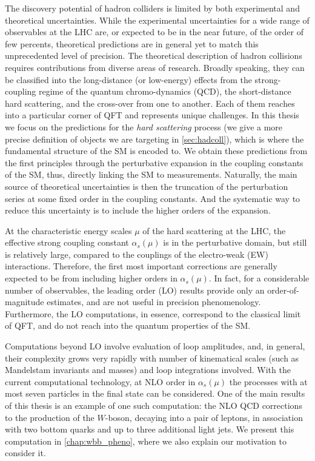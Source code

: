 The discovery potential of hadron colliders is limited by both experimental and theoretical uncertainties.
While the experimental uncertainties for a wide range of observables at the LHC are, or expected to be in the near future, of the order of few percents,
theoretical predictions are in general yet to match this unprecedented level of precision.
The theoretical description of hadron collisions requires contributions from diverse areas of research.
Broadly speaking, they can be classified into the long-distance (or low-energy) effects from 
the strong-coupling regime of the quantum chromo-dynamics (QCD), the short-distance hard scattering, and
the cross-over from one to another.
Each of them reaches into a particular corner of QFT and represents unique challenges.
In this thesis we focus on the predictions for the \emph{hard scattering} process (we give a more precise definition of objects we are targeting in \cref{sec:hadcoll}),
which is where the fundamental structure of the SM is encoded to.
We obtain these predictions from the first principles through the perturbative expansion in the coupling constants of the SM, thus, directly linking the SM to measurements.
Naturally, the main source of theoretical uncertainties is then the truncation
of the perturbation series at some fixed order in the coupling constants.
And the systematic way to reduce this uncertainty is to include the higher orders of the expansion.

At the characteristic energy scales $\mu$ of the hard scattering at the LHC, the effective strong coupling constant $\alpha_s(\mu)$
is in the perturbative domain, but still is relatively large, compared to the couplings of the electro-weak (EW) interactions.
Therefore, the first most important corrections are generally expected to be from including higher orders in $\alpha_s(\mu)$.
In fact, for a considerable number of observables,
the leading order (LO) results provide only an order-of-magnitude estimates, and are not useful in precision phenomenology.
Furthermore, the LO computations, in essence, correspond to the classical limit of QFT, and do not reach into the quantum properties of the SM.

Computations beyond LO involve evaluation of loop amplitudes, and, in general,
their complexity grows very rapidly with number of kinematical scales (such as Mandelstam invariants and masses)  and loop integrations involved.
With the current computational technology, at NLO order in $\alpha_s(\mu)$ the processes with at most seven particles in the final state
can be considered. One of the main results of this thesis is an example of one such computation:
the NLO QCD corrections to the production of the $W$-boson, decaying into a pair of leptons, in association with 
two bottom quarks and up to three additional light jets. We present this computation in \cref{chap:wbb_pheno},
where we also explain our motivation to consider it.


